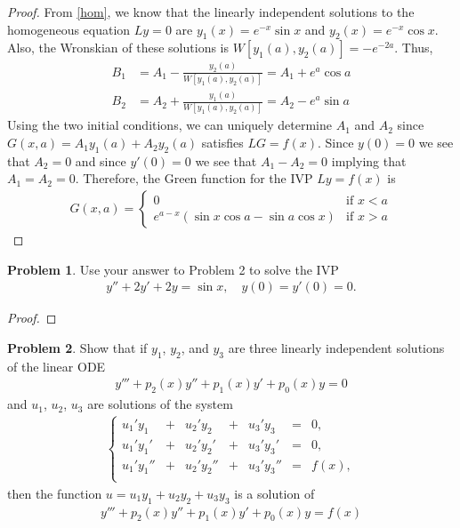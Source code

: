 \documentclass[12pt]{article}
\theoremstyle{definition}
\newtheorem{problem}{Problem}
\begin{document}
\begin{proof}
  From \eqref{hom}, we know that the linearly independent solutions to the
  homogeneous equation $Ly = 0$ are $y_1(x) = e^{-x}\sin x$ and $y_2(x) = e^{-x}\cos x$.
  Also, the Wronskian of these solutions is $W[y_1(a), y_2(a)] = -e^{-2a}$. Thus,
  \begin{align*}
    B_1 &= A_1 - \frac{y_2(a)}{W[y_1(a),y_2(a)]} = A_1 + e^{a}\cos a \\
    B_2 &= A_2 + \frac{y_1(a)}{W[y_1(a),y_2(a)]} = A_2 - e^{a}\sin a
  \end{align*}
  Using the two initial conditions, we can uniquely determine $A_1$ and $A_2$
  since $G(x, a) = A_1y_1(a) + A_2y_2(a)$ satisfies $LG = f(x)$. Since $y(0) = 0$
  we see that $A_2 = 0$ and since $y'(0) = 0$ we see that $A_1 - A_2 = 0$ implying that
  $A_1 = A_2 = 0$. Therefore, the Green function for the IVP $Ly = f(x)$ is
  \begin{align}\label{green}
    G(x, a) =
    \begin{cases}
      0 & \text{if $x < a$} \\
      e^{a-x}\left(\sin x\cos a  - \sin a \cos x\right)  & \text{if $x > a$}
    \end{cases}
  \end{align}
\end{proof}
\newpage


\begin{problem}
  Use your answer to Problem 2 to solve the IVP
  \begin{align*}
    y'' + 2y' + 2y = \sin x, \quad y(0) = y'(0) = 0.
  \end{align*}
\end{problem}

\begin{proof}
\end{proof}
\newpage


\begin{problem}
  Show that if $y_1$, $y_2$, and $y_3$ are three linearly independent solutions
  of the linear ODE
  \begin{align*}
    y''' + p_2(x)y'' + p_1(x)y' + p_0(x) y = 0
  \end{align*}
  and $u_1$, $u_2$, $u_3$ are solutions of the system
  \begin{align*}
    \left\{
      \begin{array}{lllllll}
        u_1'y_1 &+& u_2'y_2 &+& u_3'y_3 &=& 0, \\
        u_1'y_1' &+& u_2'y_2' &+& u_3'y_3' &=& 0, \\
        u_1'y_1'' &+& u_2'y_2'' &+& u_3'y_3'' &=& f(x), \\
      \end{array}
    \right.
  \end{align*}
  then the function $u = u_1 y_1 + u_2 y_2 + u_3 y_3$ is a solution of
  \begin{align*}
    y''' + p_2(x)y'' + p_1(x)y' + p_0(x) y = f(x)
  \end{align*}
\end{problem}
\end{document}
